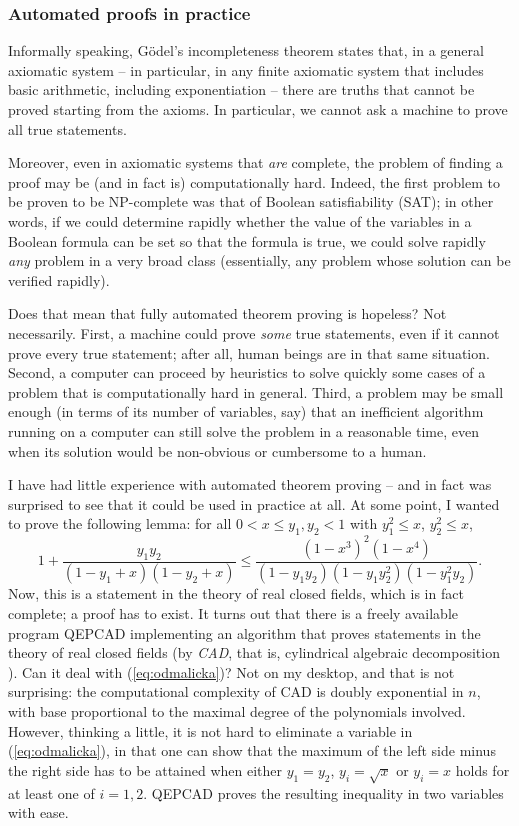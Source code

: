 \subsubsection{Automated proofs in practice}

Informally speaking,
G\"odel's incompleteness theorem states that, in a general axiomatic
system -- in particular, in any finite axiomatic system that includes basic
arithmetic, including exponentiation -- there are truths that cannot be proved
starting from the axioms. In particular, we cannot ask a machine to prove
all true statements.

Moreover, even in axiomatic systems that {\em are} complete, the problem
of finding a proof may be (and in fact is) computationally hard. Indeed,
the first problem to be proven to be NP-complete was that of Boolean
satisfiability (SAT); in other words, if we could determine rapidly whether the
value of the variables in a Boolean formula can be set so that the formula
is true, we could solve rapidly
{\em any} problem in a very broad class (essentially, any problem whose
solution can be verified rapidly).

Does that mean that fully automated theorem proving is hopeless? Not
necessarily. First, a machine could prove {\em some} true statements,
even if it cannot prove every true statement; after all, human beings are in
that same situation. Second, a computer can proceed by heuristics to solve
quickly some cases of a problem that is computationally hard in general.
Third, a problem may be small enough (in terms of its number of variables, say)
that an inefficient algorithm running on a computer can still solve the
problem in a
reasonable time, even when its solution would be non-obvious or cumbersome to a
human.

I have had little experience with automated theorem proving -- and in fact
was surprised to see that it could be used in practice at all. At some point,
I wanted to prove the following lemma: 
 for all  $0<x\leq y_1,y_2<1$ with $y_1^2\leq x$, $y_2^2\leq x$,
\begin{equation}\label{eq:odmalicka}
1 + \frac{y_1 y_2}{(1-y_1+x) (1-y_2+x)} \leq
 \frac{(1-x^3)^2 (1-x^4)}{(1- y_1 y_2) (1 - y_1 y_2^2) (1 - y_1^2 y_2)} .
\end{equation}
Now, this is a statement in the theory of real closed fields, which is in fact
complete; a proof has to exist. It turns out that there is a freely available
program QEPCAD \cite{QEPCAD} implementing an algorithm that proves statements
in the theory of real closed fields (by {\em CAD}, that is,
cylindrical algebraic
  decomposition \cite{MR0403962}). Can it deal with (\ref{eq:odmalicka})?
Not on my desktop, and that is not surprising: the computational
complexity of CAD is doubly exponential in $n$, with base proportional
to the maximal degree of the polynomials involved. However,
thinking a little, it is not hard to eliminate a variable in
(\ref{eq:odmalicka}), in that one can show that the maximum of the
left side minus the right side has to be attained when either
$y_1 = y_2$, $y_i = \sqrt{x}$ or $y_i = x$ holds for at least one of $i=1,2$.
QEPCAD proves the resulting inequality in two variables with ease.

